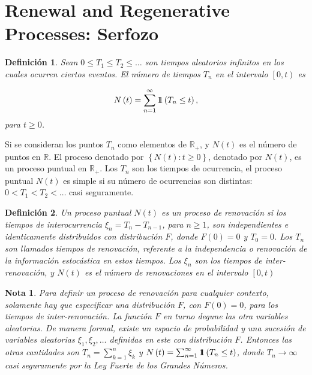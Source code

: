 \documentclass{article}
\newtheorem{Def}{Definición}
\newtheorem{Note}{Nota}
\newcommand{\rea}{\mathbb{R}}
\newcommand{\indora}{\mbox{$1$\hspace{-0.8ex}$1$}}
\begin{document}
%
\section{Renewal and Regenerative Processes: Serfozo\cite{Serfozo}}
%
\begin{Def}\label{Def.Tn}
Sean $0\leq T_{1}\leq T_{2}\leq \ldots$ son tiempos aleatorios infinitos en los cuales ocurren ciertos eventos. El n\'umero de tiempos $T_{n}$ en el intervalo $\left[0,t\right)$ es

\begin{eqnarray}
N\left(t\right)=\sum_{n=1}^{\infty}\indora\left(T_{n}\leq t\right),
\end{eqnarray}
para $t\geq0$.
\end{Def}

Si se consideran los puntos $T_{n}$ como elementos de $\rea_{+}$, y $N\left(t\right)$ es el n\'umero de puntos en $\rea$. El proceso denotado por $\left\{N\left(t\right):t\geq0\right\}$, denotado por $N\left(t\right)$, es un proceso puntual en $\rea_{+}$. Los $T_{n}$ son los tiempos de ocurrencia, el proceso puntual $N\left(t\right)$ es simple si su n\'umero de ocurrencias son distintas: $0<T_{1}<T_{2}<\ldots$ casi seguramente.

\begin{Def}
Un proceso puntual $N\left(t\right)$ es un proceso de renovaci\'on si los tiempos de interocurrencia $\xi_{n}=T_{n}-T_{n-1}$, para $n\geq1$, son independientes e identicamente distribuidos con distribuci\'on $F$, donde $F\left(0\right)=0$ y $T_{0}=0$. Los $T_{n}$ son llamados tiempos de renovaci\'on, referente a la independencia o renovaci\'on de la informaci\'on estoc\'astica en estos tiempos. Los $\xi_{n}$ son los tiempos de inter-renovaci\'on, y $N\left(t\right)$ es el n\'umero de renovaciones en el intervalo $\left[0,t\right)$
\end{Def}


\begin{Note}
Para definir un proceso de renovaci\'on para cualquier contexto, solamente hay que especificar una distribuci\'on $F$, con $F\left(0\right)=0$, para los tiempos de inter-renovaci\'on. La funci\'on $F$ en turno degune las otra variables aleatorias. De manera formal, existe un espacio de probabilidad y una sucesi\'on de variables aleatorias $\xi_{1},\xi_{2},\ldots$ definidas en este con distribuci\'on $F$. Entonces las otras cantidades son $T_{n}=\sum_{k=1}^{n}\xi_{k}$ y $N\left(t\right)=\sum_{n=1}^{\infty}\indora\left(T_{n}\leq t\right)$, donde $T_{n}\rightarrow\infty$ casi seguramente por la Ley Fuerte de los Grandes N\'umeros.
\end{Note}
\end{document}

